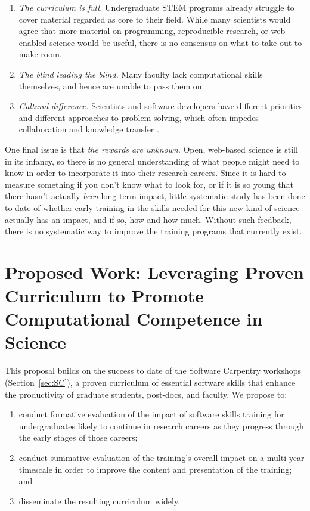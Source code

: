 \documentclass{proposalnsf}
\begin{document}
\begin{enumerate}

\item
  \emph{The curriculum is full.}  Undergraduate STEM programs already
  struggle to cover material regarded as core to their field.  While
  many scientists would agree that more material on programming,
  reproducible research, or web-enabled science would be useful, there
  is no consensus on what to take out to make room.

\item
  \emph{The blind leading the blind.}  Many faculty lack computational
  skills themselves, and hence are unable to pass them on.

\item
  \emph{Cultural difference.}  Scientists and software developers have
  different priorities and different approaches to problem solving,
  which often impedes collaboration and knowledge transfer
  \cite{segal2005a}.

\end{enumerate}

One final issue is that \emph{the rewards are unknown}.  Open,
web-based science is still in its infancy, so there is no general
understanding of what people might need to know in order to
incorporate it into their research careers.  Since it is hard to
measure something if you don't know what to look for, or if it is so
young that there hasn't actually \emph{been} long-term impact, little
systematic study has been done to date of whether early training in
the skills needed for this new kind of science actually has an impact,
and if so, how and how much.  Without such feedback, there is no
systematic way to improve the training programs that currently exist.

\section{Proposed Work: Leveraging Proven Curriculum to Promote Computational Competence in Science}

This proposal builds on the success to date of the Software Carpentry
workshops (Section~\ref{sec:SC}), a proven curriculum of essential
software skills that enhance the productivity of graduate students,
post-docs, and faculty.  We propose to:

\begin{enumerate}

\item
  conduct formative evaluation of the impact of software skills
  training for undergraduates likely to continue in research careers
  as they progress through the early stages of those careers;

\item
  conduct summative evaluation of the training's overall impact on a
  multi-year timescale in order to improve the content and
  presentation of the training; and

\item
  disseminate the resulting curriculum widely.

\end{enumerate}
\end{document}

